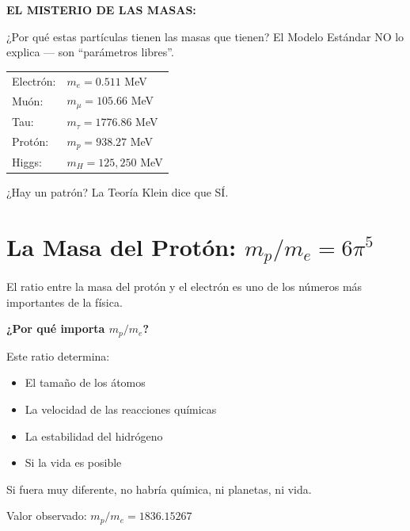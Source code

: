 \textbf{EL MISTERIO DE LAS MASAS:}

¿Por qué estas partículas tienen las masas que tienen?
El Modelo Estándar NO lo explica --- son ``parámetros libres''.

\begin{center}
\begin{tabular}{ll}
Electrón: & $m_e = 0.511$ MeV \\
Muón: & $m_\mu = 105.66$ MeV \\
Tau: & $m_\tau = 1776.86$ MeV \\
Protón: & $m_p = 938.27$ MeV \\
Higgs: & $m_H = 125,250$ MeV \\
\end{tabular}
\end{center}

¿Hay un patrón? La Teoría Klein dice que SÍ.


\section{La Masa del Protón: $m_p/m_e = 6\pi^5$}

El ratio entre la masa del protón y el electrón es uno de los
números más importantes de la física.

\begin{nivelconceptual}
\textbf{¿Por qué importa $m_p/m_e$?}

Este ratio determina:
\begin{itemize}
    \item El tamaño de los átomos
    \item La velocidad de las reacciones químicas
    \item La estabilidad del hidrógeno
    \item Si la vida es posible
\end{itemize}

Si fuera muy diferente, no habría química, ni planetas, ni vida.

Valor observado: $m_p/m_e = 1836.15267$
\end{nivelconceptual}

